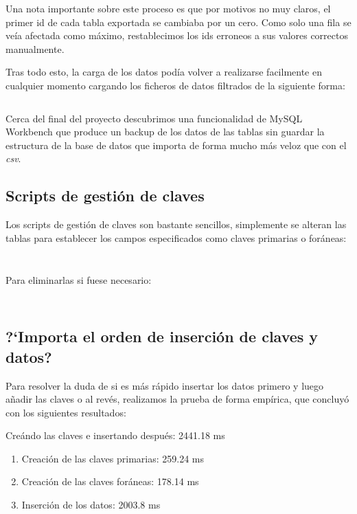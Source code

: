 \documentclass[a4paper, 11pt, oneside]{article} %
\newcommand{\scriptdir}{../scripts/} %
\begin{document}
Una nota importante sobre este proceso es que por motivos no muy claros, el primer id de cada tabla exportada se cambiaba por un cero. Como solo una fila se veía afectada como máximo, restablecimos los ids erroneos a sus valores correctos manualmente.

Tras todo esto, la carga de los datos podía volver a realizarse facilmente en cualquier momento cargando los ficheros de datos filtrados de la siguiente forma:

\inputminted{mysql}{\scriptdir load_curated_data.sql}

Cerca del final del proyecto descubrimos una funcionalidad de MySQL Workbench que produce un backup de los datos de las tablas sin guardar la estructura de la base de datos que importa de forma mucho más veloz que con el \emph{csv}.

\subsection{Scripts de gestión de claves}

Los scripts de gestión de claves son bastante sencillos, simplemente se alteran las tablas para establecer los campos especificados como claves primarias o foráneas:

\inputminted{mysql}{\scriptdir set_table_primary_keys.sql}

\inputminted{mysql}{\scriptdir set_table_foreign_keys.sql}

Para eliminarlas si fuese necesario:

\inputminted{mysql}{\scriptdir drop_table_primary_keys.sql}

\inputminted{mysql}{\scriptdir drop_table_foreign_keys.sql}




\subsection{?`Importa el orden de inserción de claves y datos?}

Para resolver la duda de si es más rápido insertar los datos primero y luego añadir las claves o al revés, realizamos la prueba de forma empírica, que concluyó con los siguientes resultados:

Creándo las claves e insertando después: 2441.18 ms

\begin{enumerate}
	\item Creación de las claves primarias: 259.24 ms 
	\item Creación de las claves foráneas: 178.14 ms
	\item Inserción de los datos: 2003.8 ms
\end{enumerate}
\end{document}
